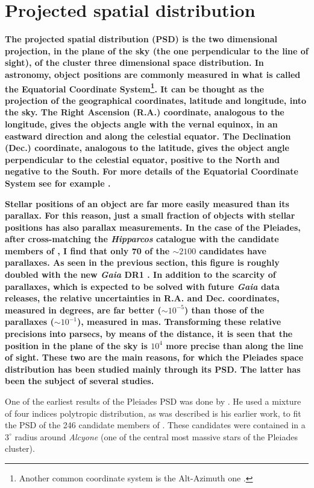 \section{Projected spatial distribution}
\label{sect:PSD}
\textbf{The projected spatial distribution (PSD) is the two dimensional projection, in the plane of the sky (the one perpendicular to the line of sight), of the cluster three dimensional space distribution. In astronomy, object positions are commonly measured in what is called the Equatorial Coordinate System\footnote{Another common coordinate system is the Alt-Azimuth one \cite[see][]{Smart1977}.}. It can be thought as the projection of the geographical coordinates, latitude and longitude, into the sky. The Right Ascension (R.A.) coordinate, analogous to the longitude, gives the objects angle with the vernal equinox, in an eastward direction and along the celestial equator. The Declination (Dec.) coordinate, analogous to the latitude, gives the object angle perpendicular to the celestial equator, positive to the North and negative to the South. For more details of the Equatorial Coordinate System see for example \citet{Smart1977}. }

\textbf{Stellar positions of an object are far more easily measured than its parallax. For this reason, just a small fraction of objects with stellar positions has also parallax measurements. In the case of the Pleiades, after cross-matching the \emph{Hipparcos} catalogue \citep{1997A&A...323L..49P} with the candidate members of \citet{Bouy2015}, I find that only 70 of the $\sim2100$ candidates have parallaxes. As seen in the previous section, this figure is roughly doubled with the new \emph{Gaia} DR1 \citep{2016A&A...595A...1G}. In addition to the scarcity of parallaxes, which is expected to be solved with future \emph{Gaia} data releases, the relative uncertainties in R.A. and Dec. coordinates, measured in degrees, are far better ($\sim 10^{-5}$) than those of the parallaxes ($\sim10^{-1}$), measured in mas. Transforming these relative precisions into parsecs, by means of the distance, it is seen that the position in the plane of the sky is $10^4$ more precise than along the line of sight.  These two are the main reasons, for which the Pleiades space distribution has been studied mainly through its PSD. The latter has been the subject of several studies. }

One of the earliest results of the Pleiades PSD was done by \citet{Limber1962}. He used a mixture of four indices polytropic distribution, as was described is his earlier \citet{Limber1961} work, to fit the PSD of the 246 candidate members of \citet{Trumpler1921}. These candidates were contained in a $3^{\circ}$ radius around \emph{Alcyone} (one of the central most massive stars of the Pleiades cluster). 

